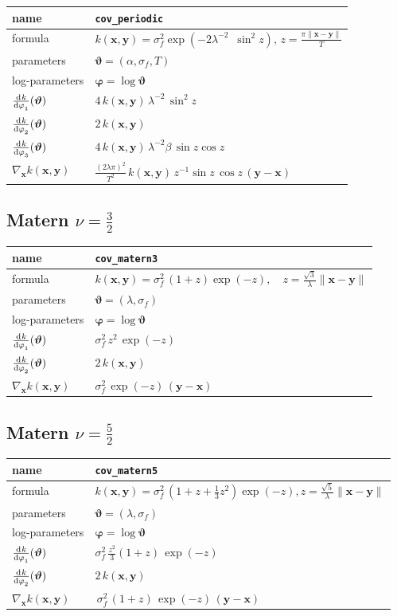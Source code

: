 \documentclass{article}
\newcommand{\NL}{\\ \midrule} %
\newcommand{\bx}{\bm{x}}
\newcommand{\by}{\bm{y}}
\newcommand{\btheta}{\bm{\vartheta}}
\newcommand{\bphi}{\bm{\varphi}}
\begin{document}
\begin{tabularx}{\textwidth}{@{} X X @{}}
%
 name & \verb|cov_periodic|  \NL
 formula &  $\displaystyle k(\bx,\by) = \sigma_f^2 \exp \left ( -2  \lambda^{-2} \,\,\, \sin^2 z   \right), \, z=\frac{\pi \|\bm{x}-\bm{y}\|}{T}$  \NL
% 
parameters & $\btheta = (\alpha, \sigma_f, T )$  \NL
% 
log-parameters & $\displaystyle \bphi = \log \btheta $ \NL
%
$\displaystyle \od{k}{\varphi_1}(\btheta)$ &   $\displaystyle 4 \,  k(\bx,\by) \, \lambda^{-2} \, \sin^2 z   $ \NL
$\displaystyle \od{k}{\varphi_2}(\btheta)$ & $\displaystyle 2 \,  k(\bx,\by)  $ \NL
$\displaystyle \od{k}{\varphi_3}(\btheta)$ &  $\displaystyle 4 \,  k(\bx,\by) \, \lambda^{-2} \beta \,  \sin z \cos z $   \NL
%
$\displaystyle \nabla_{\bx} k(\bx, \by)$ &  $\displaystyle  \frac{(2\lambda\pi)^2}{T^2} \,  k(\bx,\by) \,   z^{-1} \sin z \, \cos z \, (\by-\bx) $
%
\end{tabularx}






\subsection{Matern $\nu = \frac{3}{2}$}

\begin{tabularx}{\textwidth}{@{} X X @{}}
%
 name & \verb|cov_matern3|  \NL
 formula &  $\displaystyle k(\bx,\by) = \sigma_f^2 \, (1+z) \exp \left ( -z\right), \quad z = \frac{\sqrt{3}}{\lambda}\| \bx-\by \| $ \NL
% 
parameters & $\btheta = (\lambda, \sigma_f )$  \NL
% 
log-parameters & $\displaystyle \bphi = \log \btheta $ \NL
%
$\displaystyle \od{k}{\varphi_1}(\btheta)$ &   $\displaystyle \sigma_f^2 \,  z^2  \,\exp \left ( -z\right)  $ \NL
$\displaystyle \od{k}{\varphi_2}(\btheta)$ &   $\displaystyle 2  \,k(\bx,\by)  $\NL
%
$\displaystyle \nabla_{\bx} k(\bx, \by)$ &  $\displaystyle   \sigma_f^2   \, \exp(-z) \, (\by-\bx) $   \NL 
%
\end{tabularx}










\subsection{Matern $\nu = \frac{5}{2}$}

\begin{tabularx}{\textwidth}{@{} X X @{}}
%
 name & \verb|cov_matern5|  \NL
 formula &  $\displaystyle k(\bx,\by) = \sigma_f^2 \, (1+z+\frac{1}{3}z^2) \exp \left ( -z\right), z = \frac{\sqrt{5}}{\lambda}\| \bx-\by \| $ \NL
% 
parameters & $\btheta = (\lambda, \sigma_f )$  \NL
% 
log-parameters & $\displaystyle \bphi = \log \btheta $ \NL
%
$\displaystyle \od{k}{\varphi_1}(\btheta)$ &   $\displaystyle \sigma_f^2 \, \frac{ z^2 }{3}(1+z)\,  \exp \left ( -z\right) $ \NL
$\displaystyle \od{k}{\varphi_2}(\btheta)$ & $\displaystyle 2  \,k(\bx,\by) $ \NL
%
$\displaystyle \nabla_{\bx} k(\bx, \by)$  &  $\displaystyle   \, \sigma^2_f \, (1+z) \, \exp(-z) \, (\by-\bx) $    \NL 
%
\end{tabularx}
\end{document}
